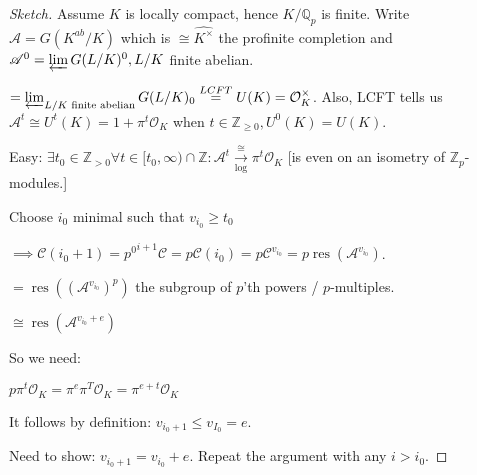 \documentclass{article}
\theoremstyle{definition}
\numberwithin{theorem}{subsection}
\begin{document}
    \begin{proof}
        [Sketch] Assume \(K\) is locally compact, hence \(K / \mathbb{Q}_p\) is finite. Write \(\mathscr{A} = G(K^{ab} / K)\) which is \(\cong \widehat{K^\times}\) the profinite completion and \(\mathscr{A}^0 = \varprojlim G(L / K)^0, L / K\) finite abelian.
        
        \(= \varprojlim_{L / K \text{ finite abelian} } G(L / K)_0 \overset{LCFT}{=} U(K) = \mathcal{O}_K^\times\). Also, LCFT tells us \(\mathscr{A}^t \cong U^t(K) = 1 + \pi^t \mathcal{O}_K\) when \(t\in\mathbb{Z} _{\geq 0}, U^0(K) = U(K)\).
        
        Easy: \(\exists t_0 \in \mathbb{Z}_{> 0} \forall t\in [t_0, \infty) \cap \mathbb{Z}: \mathscr{A}^t \xrightarrow[\log]{\cong} \pi^t \mathcal{O}_K\) [is even on an isometry of \(\mathbb{Z}_p\)-modules.]
        
        Choose \(i_0\) minimal such that \(v_{i_0} \geq t_0\) 

        \(\implies \mathscr{C} (i_0 + 1) = {p^0}^{i+1} \mathscr{C} = p \mathscr{C} (i_0) = p \mathscr{C}^{v_{i_0}} = p \operatorname{res}(\mathscr{A}^{v_{i_0}})\).
        
        \(= \operatorname{res}((\mathscr{A}^{v_{i_0}})^p)\) the subgroup of \(p\)'th powers / \(p\)-multiples.

        \(\cong \operatorname{res}(\mathscr{A}^{v_{i_0}+e})\) 
        
        So we need:

        \(p \pi^t \mathcal{O}_K = \pi^e \pi ^T \mathcal{O}_K = \pi^{e+t} \mathcal{O}_K\)

        It follows by definition: \(v_{i_0 + 1} \leq v_{I_0}=e\).

        Need to show: \(v_{i_0 + 1} = v_{i_0} + e\). Repeat the argument with any \(i > i_0\). 

    \end{proof}
\end{document}
